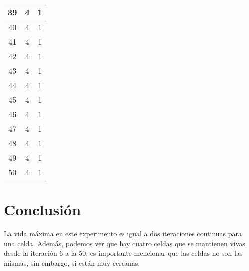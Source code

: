 \documentclass{article}
\begin{document}
\begin{tabular}{|c|c|c|}
	\hline
	39 & 4 & 1 \\
	\hline
	40 & 4 & 1 \\
	\hline
	41 & 4 & 1 \\
	\hline
	42 & 4 & 1 \\
	\hline
	43 & 4 & 1 \\
	\hline
	44 & 4 & 1 \\
	\hline
	45 & 4 & 1 \\
	\hline
	46 & 4 & 1 \\
	\hline
	47 & 4 & 1 \\
	\hline
	48 & 4 & 1 \\
	\hline
	49 & 4 & 1 \\
	\hline
	50 & 4 & 1 \\
	\hline
\end{tabular}


\section{Conclusi\'on}
La vida máxima en este experimento es igual a dos iteraciones continuas para una celda. Además, podemos ver que hay cuatro celdas que se mantienen vivas desde la iteración 6 a la 50, es importante mencionar que las celdas no son las mismas, sin embargo, si están muy cercanas.\citet{p_2}




\end{document}
